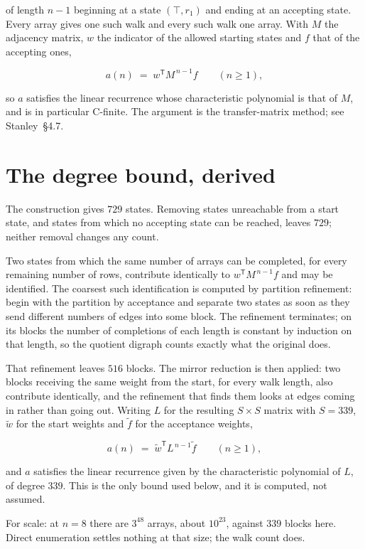 \documentclass[11pt]{article}
\theoremstyle{definition}
\begin{document}
of length $n-1$ beginning at a state $(\top,r_1)$ and ending at an accepting state. Every array gives one such walk and every such walk one array. With $M$ the adjacency matrix, $w$ the indicator of the allowed starting states and $f$ that of the accepting ones,

\[a(n) \;=\; w^{\mathsf T} M^{\,n-1} f \qquad (n \ge 1),\]

so $a$ satisfies the linear recurrence whose characteristic polynomial is that of $M$, and is in particular C-finite. The argument is the transfer-matrix method; see Stanley~\S4.7.

\section{The degree bound, derived}

The construction gives $729$ states. Removing states unreachable from a start state, and states from which no accepting state can be reached, leaves $729$; neither removal changes any count.

Two states from which the same number of arrays can be completed, for every remaining number of rows, contribute identically to $w^{\mathsf T}M^{\,n-1}f$ and may be identified. The coarsest such identification is computed by partition refinement: begin with the partition by acceptance and separate two states as soon as they send different numbers of edges into some block. The refinement terminates; on its blocks the number of completions of each length is constant by induction on that length, so the quotient digraph counts exactly what the original does.

That refinement leaves $516$ blocks. The mirror reduction is then applied: two blocks receiving the same weight from the start, for every walk length, also contribute identically, and the refinement that finds them looks at edges coming in rather than going out. Writing $L$ for the resulting $S \times S$ matrix with $S = 339$, $\tilde w$ for the start weights and $\tilde f$ for the acceptance weights,

\[a(n) \;=\; \tilde w^{\mathsf T} L^{\,n-1} \tilde f \qquad (n \ge 1),\]

and $a$ satisfies the linear recurrence given by the characteristic polynomial of $L$, of degree $339$. This is the only bound used below, and it is computed, not assumed.

For scale: at $n = 8$ there are $3^{48}$ arrays, about $10^{23}$, against $339$ blocks here. Direct enumeration settles nothing at that size; the walk count does.
\end{document}
